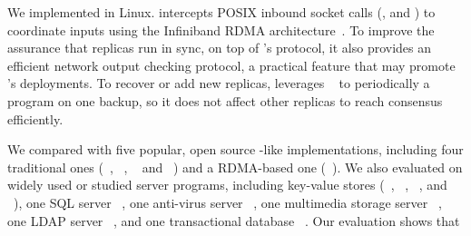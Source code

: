 


We implemented \xxx in Linux. \xxx intercepts POSIX inbound socket calls
(\eg, \accept and \recv) to coordinate inputs using the Infiniband
RDMA architecture~\cite{infiniband}. To improve the assurance that replicas run 
in sync, on top of \xxx's \paxos protocol, it also provides an efficient 
network output checking protocol, a practical feature that may promote \xxx's 
deployments. To recover or add new replicas, \xxx leverages \criu~\cite{criu} 
to periodically a program on one backup, so it does not affect other replicas 
to reach consensus efficiently.


We compared \xxx with five popular, open source \paxos-like implementations,
including four traditional ones (\libpaxos~\cite{libpaxos},
\zookeeper~\cite{zookeeper}, \crane~\cite{crane:sosp15} and
\spaxos~\cite{spaxos}) and a RDMA-based one (\dare~\cite{dare:hpdc15}). We
also evaluated \xxx on \nprog widely used or studied server programs, including
\nkvprog key-value stores (\redis~\cite{redis}, \memcached~\cite{memcached},
\ssdb~\cite{ssdb}, and \mongodb~\cite{mongodb}), one SQL server
\mysql~\cite{mysql}, one anti-virus server \clamav~\cite{clamav}, one multimedia
storage server \mediatomb~\cite{mediatomb}, one LDAP server
\openldap~\cite{openldap}, and one transactional database
\calvin~\cite{calvin:sigmod12}. Our evaluation shows that

